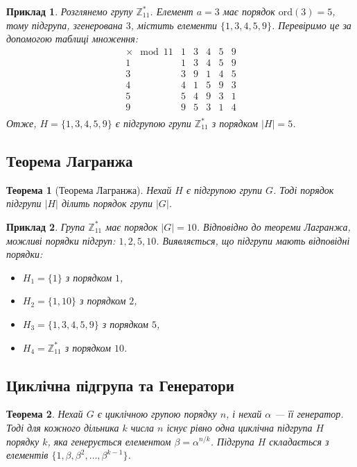 \documentclass[12pt]{report}
\newtheorem{theorem}{Теорема}[chapter]
\newtheorem{example}{Приклад}[chapter]
\begin{document}
\begin{example}
Розглянемо групу \( \mathbb{Z}^*_{11} \). Елемент \( a = 3 \) має порядок \( \text{ord}(3) = 5 \), тому підгрупа, згенерована \( 3 \), містить елементи \( \{1, 3, 4, 5, 9\} \). Перевіримо це за допомогою таблиці множення:
\[
\begin{array}{c|ccccc}
\times \mod 11 & 1 & 3 & 4 & 5 & 9 \\
\hline
1 & 1 & 3 & 4 & 5 & 9 \\
3 & 3 & 9 & 1 & 4 & 5 \\
4 & 4 & 1 & 5 & 9 & 3 \\
5 & 5 & 4 & 9 & 3 & 1 \\
9 & 9 & 5 & 3 & 1 & 4 \\
\end{array}
\]
Отже, \( H = \{1, 3, 4, 5, 9\} \) є підгрупою групи \( \mathbb{Z}^*_{11} \) з порядком \( |H| = 5 \).
\end{example}

\subsection{Теорема Лагранжа}

\begin{theorem}[Теорема Лагранжа]
Нехай \( H \) є підгрупою групи \( G \). Тоді порядок підгрупи \( |H| \) ділить порядок групи \( |G| \).
\end{theorem}

\begin{example}
Група \( \mathbb{Z}^*_{11} \) має порядок \( |G| = 10 \). Відповідно до теореми Лагранжа, можливі порядки підгруп: \( 1, 2, 5, 10 \). Виявляється, що підгрупи мають відповідні порядки:
\begin{itemize}
    \item \( H_1 = \{1\} \) з порядком \( 1 \),
    \item \( H_2 = \{1, 10\} \) з порядком \( 2 \),
    \item \( H_3 = \{1, 3, 4, 5, 9\} \) з порядком \( 5 \),
    \item \( H_4 = \mathbb{Z}^*_{11} \) з порядком \( 10 \).
\end{itemize}
\end{example}

\subsection{Циклічна підгрупа та Генератори}

\begin{theorem}
Нехай \( G \) є циклічною групою порядку \( n \), і нехай \( \alpha \) — її генератор. Тоді для кожного дільника \( k \) числа \( n \) існує рівно одна циклічна підгрупа \( H \) порядку \( k \), яка генерується елементом \( \beta = \alpha^{n/k} \). Підгрупа \( H \) складається з елементів \( \{1, \beta, \beta^2, \ldots, \beta^{k-1}\} \).
\end{theorem}
\end{document}
